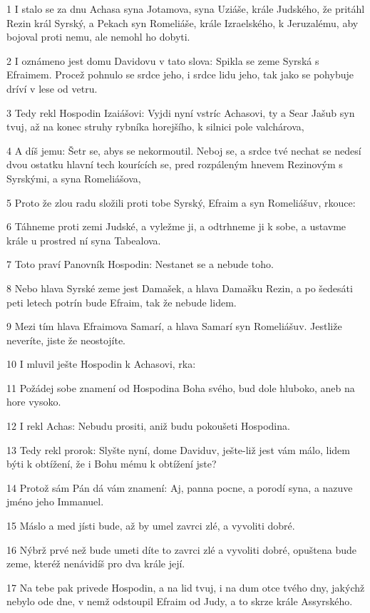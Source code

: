 \par 1 I stalo se za dnu Achasa syna Jotamova, syna Uziáše, krále Judského, že pritáhl Rezin král Syrský, a Pekach syn Romeliáše, krále Izraelského, k Jeruzalému, aby bojoval proti nemu, ale nemohl ho dobyti.
\par 2 I oznámeno jest domu Davidovu v tato slova: Spikla se zeme Syrská s Efraimem. Procež pohnulo se srdce jeho, i srdce lidu jeho, tak jako se pohybuje dríví v lese od vetru.
\par 3 Tedy rekl Hospodin Izaiášovi: Vyjdi nyní vstríc Achasovi, ty a Sear Jašub syn tvuj, až na konec struhy rybníka horejšího, k silnici pole valchárova,
\par 4 A díš jemu: Šetr se, abys se nekormoutil. Neboj se, a srdce tvé nechat se nedesí dvou ostatku hlavní tech kourících se, pred rozpáleným hnevem Rezinovým s Syrskými, a syna Romeliášova,
\par 5 Proto že zlou radu složili proti tobe Syrský, Efraim a syn Romeliášuv, rkouce:
\par 6 Táhneme proti zemi Judské, a vyležme ji, a odtrhneme ji k sobe, a ustavme krále u prostred ní syna Tabealova.
\par 7 Toto praví Panovník Hospodin: Nestanet se a nebude toho.
\par 8 Nebo hlava Syrské zeme jest Damašek, a hlava Damašku Rezin, a po šedesáti peti letech potrín bude Efraim, tak že nebude lidem.
\par 9 Mezi tím hlava Efraimova Samarí, a hlava Samarí syn Romeliášuv. Jestliže neveríte, jiste že neostojíte.
\par 10 I mluvil ješte Hospodin k Achasovi, rka:
\par 11 Požádej sobe znamení od Hospodina Boha svého, bud dole hluboko, aneb na hore vysoko.
\par 12 I rekl Achas: Nebudu prositi, aniž budu pokoušeti Hospodina.
\par 13 Tedy rekl prorok: Slyšte nyní, dome Daviduv, ješte-liž jest vám málo, lidem býti k obtížení, že i Bohu mému k obtížení jste?
\par 14 Protož sám Pán dá vám znamení: Aj, panna pocne, a porodí syna, a nazuve jméno jeho Immanuel.
\par 15 Máslo a med jísti bude, až by umel zavrci zlé, a vyvoliti dobré.
\par 16 Nýbrž prvé než bude umeti díte to zavrci zlé a vyvoliti dobré, opuštena bude zeme, kteréž nenávidíš pro dva krále její.
\par 17 Na tebe pak privede Hospodin, a na lid tvuj, i na dum otce tvého dny, jakýchž nebylo ode dne, v nemž odstoupil Efraim od Judy, a to skrze krále Assyrského.
